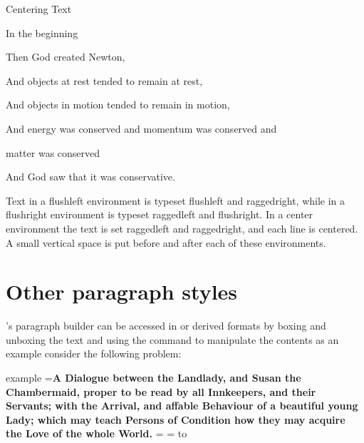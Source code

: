 \begin{texexample}{Centering Text}{}
\begin{center}
In the beginning

Then God created Newton,

And objects at rest tended to remain at rest,

And objects in motion tended to remain in motion,

And energy was conserved and momentum was conserved and

matter was conserved

And God saw that it was conservative.
\end{center}
\end{texexample}


Text in a flushleft environment is typeset flushleft and raggedright, while in a
flushright environment is typeset raggedleft and flushright. In a center environment
the text is set raggedleft and raggedright, and each line is centered. A small vertical space
is put before and after each of these environments.


\section{Other paragraph styles}

\tex's paragraph builder can be accessed in \tex or \latex derived formats by boxing and unboxing the text and using the command \cmd{\lastbox} to manipulate the contents as an example consider the following problem:

\def\weirdtitle#1{%
       \bgroup
       \setbox0=\vbox{\bf\noindent #1}%
       \setbox1=\vbox{%
            \unvbox0
            \setbox2=\lastbox
            \hbox to \linewidth{\hfill\unhbox2 \hfill}%
       }%
       \unvbox1
      \egroup
  }%

\def\wavelast#1{%
       \bgroup
       \setbox0=\vbox{\bf\noindent #1}%
       \setbox1=\vbox{%
            \unvbox0
            \setbox2=\lastbox
            \hbox to \linewidth{\hfill\uwave{\unhbox2}\hfill}%
       }%
      \egroup
  }%
  
\begin{scriptexample}{example}{}
\weirdtitle{A Dialogue between the Landlady, and Susan the Chambermaid, proper to be
read by all Innkeepers, and their Servants; with the Arrival, and
affable Behaviour of a beautiful young Lady; which may teach Persons of
Condition how they may acquire the Love of the whole World.}
\end{scriptexample}


